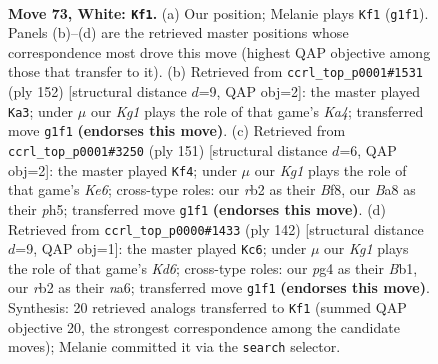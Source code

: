 \documentclass[11pt]{article}
\begin{document}
\clearpage

\begin{figure}[p]\centering
\begin{subfigure}{0.46\textwidth}\centering
\resizebox{\linewidth}{!}{%
\newchessgame
\chessboard[
  setfen={B7/8/6k1/4p3/5pp1/8/1r6/6K1 w - - 0 73},
  showmover=false,
  pgfstyle=straightmove, color=movearrow, markmove={g1-f1}
]}
\caption{}
\end{subfigure}\hfill
\begin{subfigure}{0.46\textwidth}\centering
\resizebox{\linewidth}{!}{%
\newchessgame
\chessboard[
  setfen={8/5p2/6p1/6B1/K5P1/8/5k2/8 w - - 4 77},
  showmover=false,
  pgfstyle=straightmove, color=movearrow, markmove={a4-a3}
]}
\caption{}
\end{subfigure}
\\[4pt]
\begin{subfigure}{0.46\textwidth}\centering
\resizebox{\linewidth}{!}{%
\newchessgame
\chessboard[
  setfen={5b2/8/8/3K3P/6P1/4k2P/8/8 b - - 10 76},
  showmover=false,
  pgfstyle=straightmove, color=movearrow, markmove={e3-f4}
]}
\caption{}
\end{subfigure}\hfill
\begin{subfigure}{0.46\textwidth}\centering
\resizebox{\linewidth}{!}{%
\newchessgame
\chessboard[
  setfen={8/p7/np1K4/6k1/8/8/8/1B6 w - - 0 72},
  showmover=false,
  pgfstyle=straightmove, color=movearrow, markmove={d6-c6}
]}
\caption{}
\end{subfigure}
\caption{\textbf{Move 73, White: \texttt{Kf1}.} (a) Our position; Melanie plays \texttt{Kf1} (\texttt{g1f1}). Panels (b)--(d) are the retrieved master positions whose correspondence most drove this move (highest QAP objective among those that transfer to it). (b) Retrieved from \texttt{ccrl\_top\_p0001\#1531} (ply 152) [structural distance $d$=9, QAP obj=2]: the master played \texttt{Ka3}; under $\mu$ our \emph{Kg1} plays the role of that game's \emph{Ka4}; transferred move \texttt{g1f1} \textbf{(endorses this move)}. (c) Retrieved from \texttt{ccrl\_top\_p0001\#3250} (ply 151) [structural distance $d$=6, QAP obj=2]: the master played \texttt{Kf4}; under $\mu$ our \emph{Kg1} plays the role of that game's \emph{Ke6}; cross-type roles: our \emph{r}b2 as their \emph{B}f8, our \emph{B}a8 as their \emph{p}h5; transferred move \texttt{g1f1} \textbf{(endorses this move)}. (d) Retrieved from \texttt{ccrl\_top\_p0000\#1433} (ply 142) [structural distance $d$=9, QAP obj=1]: the master played \texttt{Kc6}; under $\mu$ our \emph{Kg1} plays the role of that game's \emph{Kd6}; cross-type roles: our \emph{p}g4 as their \emph{B}b1, our \emph{r}b2 as their \emph{n}a6; transferred move \texttt{g1f1} \textbf{(endorses this move)}. Synthesis: 20 retrieved analogs transferred to \texttt{Kf1} (summed QAP objective 20, the strongest correspondence among the candidate moves); Melanie committed it via the \texttt{search} selector.}
\label{fig:thought-m144}
\end{figure}
\end{document}
